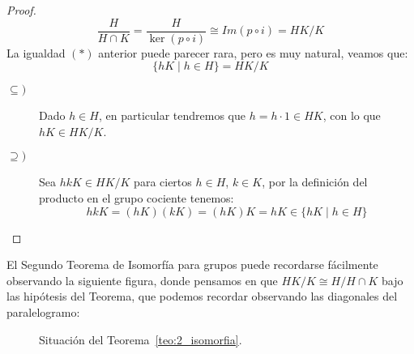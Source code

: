 \begin{teo}
\begin{proof}
        \begin{equation*}
            \dfrac{H}{H\cap K} = \dfrac{H}{\ker(p\circ i)} \cong Im(p\circ i) = HK/K
        \end{equation*}
        La igualdad $(\ast)$ anterior puede parecer rara, pero es muy natural, veamos que:
        \begin{equation*}
            \{hK\mid h \in H\} = HK/K
        \end{equation*}
        \begin{description}
            \item [$\subseteq)$] Dado $h\in H$, en particular tendremos que $h = h\cdot 1 \in HK$, con lo que ${hK \in HK/K}$.
            \item [$\supseteq)$] Sea $hkK\in HK/K$ para ciertos $h\in H$, $k\in K$, por la definición del producto en el grupo cociente tenemos:
                \begin{equation*}
                    hkK = (hK)(kK) = (hK)K = hK \in \{hK \mid h\in H\}
                \end{equation*} \qedhere
        \end{description}
    \end{proof}
\end{teo}

\noindent
El Segundo Teorema de Isomorfía para grupos puede recordarse fácilmente observando la siguiente figura, donde pensamos en que $HK/K\cong H/H\cap K$ bajo las hipótesis del Teorema, que podemos recordar observando las diagonales del paralelogramo:
\begin{figure}[H]
    \centering
    \caption{Situación del Teorema~\ref{teo:2_isomorfia}.}
    \label{fig:2_isomorfia}
\end{figure}

